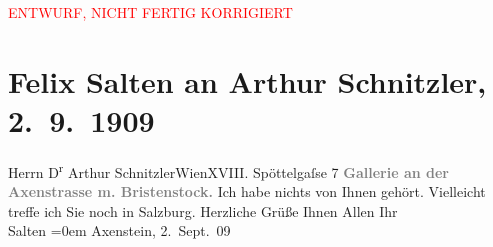 
\begin{center}
            \textcolor{red}{ENTWURF, NICHT FERTIG KORRIGIERT}
                      \end{center}
            
         \renewcommand{\erwaehnteOrte}{Orte: Axenstein, Axenstraße, Bristen, Edmund-Weiß-Gasse, Morschach, Salzburg, Wien}
         \renewcommand{\erwaehnteWerke}{}
               \section[Felix Salten an Arthur Schnitzler, 2. 9. 1909]{ Felix Salten an Arthur Schnitzler, 2. 9. 1909}\nopagebreak{}\rehead{ }\begin{ledgroupsized}[t]{13cm}\normalsize\beginnumbering \toendnotes[C]{\smallbreak\pagebreak[2]} 
\pstart{}{\pb}Herrn D\textsuperscript{r} Arthur Schnitzler\pend{}\pstart{}Wien\pend{}\pstart{}XVIII. Spöttelgaſse 7\pend{}{\bigskip}\pstart
           \noindent{}\centering{}{\pb}\textcolor{gray}{\textbf{Gallerie an der Axenstrasse m. Bristenstock.}}\pend
           \pstart
           Ich habe nichts von Ihnen gehört. Vielleicht treffe ich Sie noch in Salzburg. Herzliche Grüße Ihnen Allen\pend
           \pstart
           Ihr {\\[\baselineskip]}\spacefill\mbox{Salten}\pend
           \leftskip=0em{}\pstart
           Axenstein, 2. Sept. 09\pend
           
         
         \endnumbering{}\end{ledgroupsized}\begin{anhang}\end{anhang}\newcommand{\dateiname}{L03508}\newcommand{\titel}{Felix Salten an Arthur Schnitzler, 2. 9. 1909}\newcommand{\editorInnen}{Martin Anton Müller und Laura Untner}
      